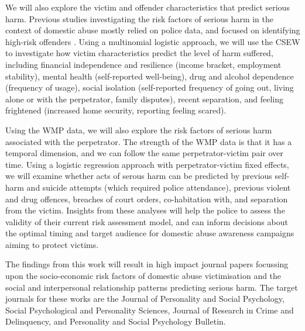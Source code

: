 \documentclass[11pt, a4paper]{article}
\newcommand{\TM}[1] {{\textcolor{orange}{#1}}}
\newcommand{\AT}[1] {{\textcolor{blue}{#1}}}
\begin{document}
 We will also explore the victim and offender characteristics that predict serious harm. Previous studies investigating the risk factors of serious harm in the context of domestic abuse mostly relied on police data, and focused on identifying high-risk offenders \cite{thornton}. Using a multinomial logistic approach, we will use the CSEW to investigate how victim characteristics predict the level of harm suffered, including financial independence and resilience (income bracket, employment stability), mental health (self-reported well-being), drug and alcohol dependence (frequency of usage), social isolation (self-reported frequency of going out, living alone or with the perpetrator, family disputes), recent separation, and feeling frightened (increased home security, reporting feeling scared).
 
 Using the WMP data, we will also explore the risk factors of serious harm associated with the perpetrator. The strength of the WMP data is that it has a temporal dimension, and we can follow the same perpetrator-victim pair over time. Using a logistic regression approach with perpetrator-victim fixed effects, we will examine whether acts of serous harm can be predicted by previous self-harm and suicide attempts (which required police attendance), previous violent and drug offences, breaches of court orders, co-habitation with, and separation from the victim. Insights from these analyses will help the police to assess the validity of their current risk assessment model, and can inform decisions about the optimal timing and target audience for domestic abuse awareness campaigns aiming to protect victims. 
 
 The findings from this work will result in high impact journal papers focussing upon the socio-economic risk factors of domestic abuse victimisation and the social and interpersonal relationship patterns predicting serious harm. The target journals for these works are the Journal of Personality and Social Psychology, Social Psychological and Personality Sciences, Journal of Research in Crime and Delinquency, and Personality and Social Psychology Bulletin.
 
 


%
%
\end{document}
